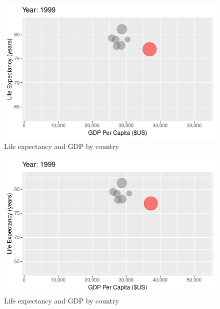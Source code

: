 \documentclass[
  letterpaper,
  DIV=11,
  numbers=noendperiod]{scrreport}
\theoremstyle{definition}
\theoremstyle{remark}
\begin{document}
\begin{figure}

{\centering \includegraphics{index_files/figure-pdf/fig-anim-country-85.pdf}

}

\caption{\label{fig-anim-country-85}Life expectancy and GDP by country}

\end{figure}

\begin{figure}

{\centering \includegraphics{index_files/figure-pdf/fig-anim-country-86.pdf}

}

\caption{\label{fig-anim-country-86}Life expectancy and GDP by country}

\end{figure}
\end{document}
